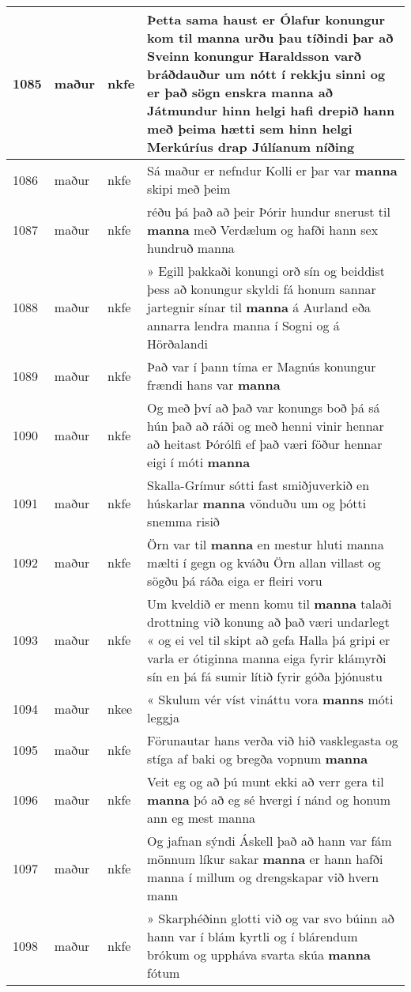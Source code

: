 \documentclass{article}
\begin{document}
\begin{longtable}{p{1cm}|p{1cm}|p{1cm}|p{13cm}}
\hline
1085&maður&nkfe&Þetta sama haust er Ólafur konungur kom til \textbf{manna} urðu þau tíðindi þar að Sveinn konungur Haraldsson varð bráðdauður um nótt í rekkju sinni og er það sögn enskra manna að Játmundur hinn helgi hafi drepið hann með þeima hætti sem hinn helgi Merkúríus drap Júlíanum níðing\\
\hline
1086&maður&nkfe&Sá maður er nefndur Kolli er þar var \textbf{manna} skipi með þeim\\
\hline
1087&maður&nkfe&réðu þá það að þeir Þórir hundur snerust til \textbf{manna} með Verdælum og hafði hann sex hundruð manna\\
\hline
1088&maður&nkfe&» Egill þakkaði konungi orð sín og beiddist þess að konungur skyldi fá honum sannar jartegnir sínar til \textbf{manna} á Aurland eða annarra lendra manna í Sogni og á Hörðalandi\\
\hline
1089&maður&nkfe&Það var í þann tíma er Magnús konungur frændi hans var \textbf{manna} \\
\hline
1090&maður&nkfe&Og með því að það var konungs boð þá sá hún það að ráði og með henni vinir hennar að heitast Þórólfi ef það væri föður hennar eigi í móti \textbf{manna} \\
\hline
1091&maður&nkfe&Skalla-Grímur sótti fast smiðjuverkið en húskarlar \textbf{manna} vönduðu um og þótti snemma risið\\
\hline
1092&maður&nkfe&Örn var til \textbf{manna} en mestur hluti manna mælti í gegn og kváðu Örn allan villast og sögðu þá ráða eiga er fleiri voru\\
\hline
1093&maður&nkfe&Um kveldið er menn komu til \textbf{manna} talaði drottning við konung að það væri undarlegt « og ei vel til skipt að gefa Halla þá gripi er varla er ótiginna manna eiga fyrir klámyrði sín en þá fá sumir lítið fyrir góða þjónustu\\
\hline
1094&maður&nkee&« Skulum vér víst vináttu vora \textbf{manns} móti leggja\\
\hline
1095&maður&nkfe&Förunautar hans verða við hið vasklegasta og stíga af baki og bregða vopnum \textbf{manna} \\
\hline
1096&maður&nkfe&Veit eg og að þú munt ekki að verr gera til \textbf{manna} þó að eg sé hvergi í nánd og honum ann eg mest manna\\
\hline
1097&maður&nkfe&Og jafnan sýndi Áskell það að hann var fám mönnum líkur sakar \textbf{manna} er hann hafði manna í millum og drengskapar við hvern mann\\
\hline
1098&maður&nkfe&» Skarphéðinn glotti við og var svo búinn að hann var í blám kyrtli og í blárendum brókum og uppháva svarta skúa \textbf{manna} fótum\\

\end{longtable}
\end{document}
